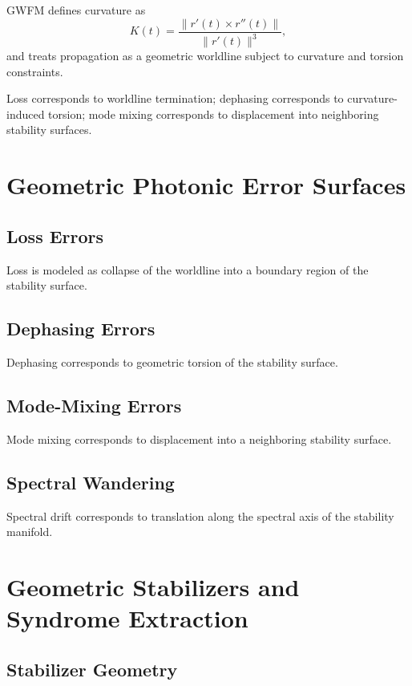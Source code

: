 \documentclass[aip, reprint, superscriptaddress]{revtex4-2}
\begin{document}
GWFM defines curvature as
\begin{equation}
K(t) = \frac{\| r'(t) \times r''(t) \|}{\| r'(t) \|^3},
\end{equation}
and treats propagation as a geometric worldline subject to curvature and torsion 
constraints.

Loss corresponds to worldline termination; dephasing corresponds to curvature-induced 
torsion; mode mixing corresponds to displacement into neighboring stability surfaces.

\section{Geometric Photonic Error Surfaces}

\subsection{Loss Errors}

Loss is modeled as collapse of the worldline into a boundary region of the stability 
surface.

\subsection{Dephasing Errors}

Dephasing corresponds to geometric torsion of the stability surface.

\subsection{Mode-Mixing Errors}

Mode mixing corresponds to displacement into a neighboring stability surface.

\subsection{Spectral Wandering}

Spectral drift corresponds to translation along the spectral axis of the stability manifold.

\section{Geometric Stabilizers and Syndrome Extraction}

\subsection{Stabilizer Geometry}
\end{document}
